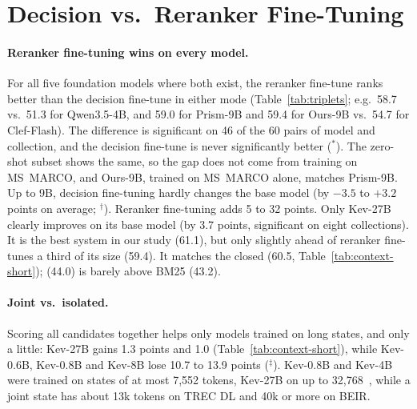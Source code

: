 \section{Decision vs.\ Reranker Fine-Tuning}
\label{sec:reranking}



\paragraph{Reranker fine-tuning wins on every model.}
For all five foundation models where both exist, the reranker fine-tune ranks better than the decision fine-tune in
either mode (Table~\ref{tab:triplets}; e.g.\ 58.7 vs.\ 51.3 for Qwen3.5-4B, and 59.0 for Prism-9B and 59.4 for
Ours-9B vs.\ 54.7 for Clef-Flash). The difference is significant on 46 of the 60 pairs of model and collection, and
the decision fine-tune is never significantly better ($^\ast$). The zero-shot subset shows the same, so the gap does not come from training on
MS~MARCO, and Ours-9B, trained on MS~MARCO alone, matches Prism-9B. Up to 9B, decision fine-tuning hardly changes
the base model (by $-3.5$ to $+3.2$ points on average; $^\dagger$). Reranker fine-tuning adds 5 to 32 points. Only
Kev-27B clearly improves on its base model (by 3.7 points, significant on eight collections). It is the best system
in our study (61.1), but only slightly ahead of reranker fine-tunes a third of its size (59.4). It matches the closed
\jev{} (60.5, Table~\ref{tab:context-short}); \laya{} (44.0) is barely above BM25 (43.2).

\paragraph{Joint vs.\ isolated.}
Scoring all candidates together helps only models trained on long states, and only a little: Kev-27B gains 1.3
points and \jev{} 1.0 (Table~\ref{tab:context-short}), while Kev-0.6B, Kev-0.8B and Kev-8B lose 10.7 to 13.9 points
($^\ddagger$). Kev-0.8B and Kev-4B were trained on states of at most 7,552 tokens, Kev-27B on up to
32,768~\cite{KevCards}, while a joint state has about 13k tokens on TREC DL and 40k
or more on BEIR.



